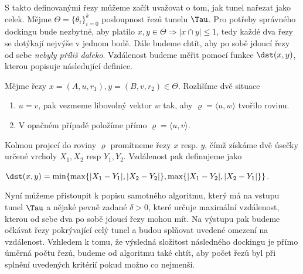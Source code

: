 S takto definovanými řezy můžeme začít uvažovat o tom, jak tunel nařezat jako celek.
Mějme $ \Theta = \{\theta_i\}_{i=0}^{k}$ posloupnost řezů tunelu $ \Tau $. Pro potřeby správného
dockingu bude nezbytné, aby platilo $ x, y \in \Theta \Rightarrow |x \cap y| \leq 1 $,
tedy každé dva řezy se dotýkají nejvýše v jednom bodě. Dále budeme chtít, aby po sobě
jdoucí řezy od sebe \textit{nebyly příliš daleko}. Vzdálenost budeme měřit pomocí funkce
$ \dst(x, y) $, kterou popisuje následující definice.

\begin{defi}
Mějme řezy $ x = (A, u, r_1), y = (B, v, r_2) \in \Theta $. Rozlišíme dvě situace
    \begin{enumerate}[label={(\arabic*)}]
        \item $ u = v $, pak vezmeme libovolný vektor $ w $ tak, aby
            $ \varrho = \langle u, w \rangle $ tvořilo rovinu.
        \item V opačném případě položíme přímo $ \varrho = \langle u, v \rangle $.
    \end{enumerate}
Kolmou projecí do roviny $ \varrho $ promítneme řezy $x $ resp. $y$, čímž získáme dvě úsečky
určené vrcholy $X_1, X_2 $ resp $Y_1, Y_2 $. Vzdálenost pak definujeme jako
    \begin{center}
        $ \dst(x, y) = \min\{ \max\{|X_1 - Y_1|, |X_2 - Y_2|\}, \max\{|X_1 - Y_2|, |X_2 - Y_1|\}\}$.
    \end{center}
\end{defi}

Nyní můžeme přistoupit k popisu samotného algoritmu, který má na vstupu tunel $ \Tau $
a nějaké pevně zadané $ \delta > 0$, které určuje maximální vzdálenost, kterou
od sebe dva po sobě jdoucí řezy mohou mít. Na výstupu pak budeme očkávat řezy pokrývající
celý tunel a budou splňovat uvedené omezení na vzdálenost. Vzhledem k tomu, že výsledná
složitost následného dockingu je přímo úměrná počtu řezů, budeme od algoritmu také chtít,
aby počet řezů byl při splnění uvedených kritérií pokud možno co nejmenší.


